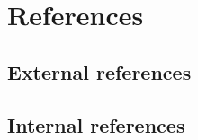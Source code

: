 \section{References} \label{s:introduction:references}
	\begin{comment}
		$<$List all of the applicable reference documents. The references are separated into “external” references
		that are imposed external to the project and “internal” references that are imposed from within to the
		project. This may also be at the end of the document.$>$
	\end{comment}
	
\subsection*{External references} \label{s:introduction:external-references}
	\begin{comment}
		$<$List references to the relevant policies or laws that give rise to the need for this plan, e.g.		
		\begin{enumerate}
		\item Laws
		\item Government regulations
		\item Standards (e.g., governmental and/or consensus)
		\item IEEE Std. 829-2008 - IEEE Standard for Software and System Test Documentation.
		IEEE Computer Society, 2008.
		\item Policies
		\end{enumerate}
		The reference to this standard includes how and if it has been tailored for this project, an overview of
		the level(s) of documentation expected, and their contents (or a reference to an organizational standard
		or document that delineates the expected test documentation details).$>$
	\end{comment}


\subsection*{Internal references} \label{s:introduction:internal-references}
	\begin{comment}
		$<$ List references to documents such as other plans or task descriptions that supplement this plan, e.g.:
		\begin{enumerate}
		\item Project authorization
		\item Project plan (or project management plan)
		\item Quality assurance plan
		\item Configuration management plan
		\end{enumerate}
		$>$
	\end{comment}

